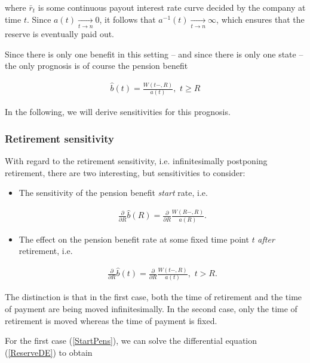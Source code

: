 \documentclass{article}
\newcommand{\1}[1]{\mathbbm{1}_{\left\lbrace #1 \right\rbrace}}
\theoremstyle{break}
\theoremstyle{remark}
\numberwithin{equation}{section}
\begin{document}
where $\bar{r}_t$ is some continuous payout interest rate curve decided by the company at time $t$. Since $a(t) \underset{t \to n}{\longrightarrow} 0$, it follows that $a^{-1}(t) \underset{t \to n}{\longrightarrow} \infty$, which ensures that the reserve is eventually paid out.

Since there is only one benefit in this setting -- and since there is only one state -- the only prognosis is of course the pension benefit

\begin{align*}
	\hat{b}(t) = \frac{W(t-,R)}{a(t)}, \, \, t \geq R
\end{align*}

In the following, we will derive sensitivities for this prognosis.

\subsubsection{Retirement sensitivity}

With regard to the retirement sensitivity, i.e. infinitesimally postponing retirement, there are two interesting, but sensitivities to consider:

\begin{itemize}
	\item The sensitivity of the pension benefit \textit{start} rate, i.e.
	
	\begin{align} \label{StartPens}
		\frac{\partial}{\partial R} \hat{b}(R) = \frac{\partial}{\partial R} \frac{W(R-,R)}{a(R)}.
	\end{align}

	\item The effect on the pension benefit rate at some fixed time point $t$ \textit{after} retirement, i.e.
	
	\begin{align} \label{LaterPens}
		\frac{\partial}{\partial R} \hat{b}(t) = \frac{\partial}{\partial R} \frac{W(t-,R)}{a(t)}, \, \, t > R.
	\end{align}
	
\end{itemize}

The distinction is that in the first case, both the time of retirement and the time of payment are being moved infinitesimally. In the second case, only the time of retirement is moved whereas the time of payment is fixed.

For the first case (\ref{StartPens}), we can solve the differential equation (\ref{ReserveDE}) to obtain
\end{document}
